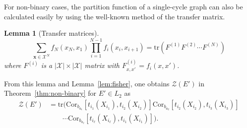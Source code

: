 \documentclass[a4paper,10pt,twoside,twocolumn,openany,final]{memoir}
\newcommand{\Cor}{\mathrm{Cor}}
\theoremstyle{plain}
\newtheorem{lemma}[theorem]{Lemma}
\theoremstyle{definition}
\theoremstyle{remark}
\begin{document}
For non-binary cases, the partition function of a single-cycle graph can also be calculated easily
by using the well-known method of the transfer matrix.
\begin{lemma}[Transfer matrices]
\begin{equation*}
\sum_{\bm{x}\in\mathcal{X}^N}
f_N(x_N, x_1) \prod_{i=1}^{N-1} f_i(x_i, x_{i+1})
= \mathrm{tr}(F^{(1)} F^{(2)} \dotsm F^{(N)})
\end{equation*}
where $F^{(i)}$ is a $|\mathcal{X}|\times |\mathcal{X}|$ matrix with $F^{(i)}_{x, x'} = f_i(x, x')$.
\end{lemma}
From this lemma and Lemma~\ref{lem:fisher},
one obtains $\mathcal{Z}(E')$
in Theorem~\ref{thm:non-binary}
for $E'\in L_2$ as
\begin{align}
\mathcal{Z}(E')&=
\mathrm{tr}
\big(
\Cor_{b_{a_1}}[t_{i_1}(X_{i_1}), t_{i_2}(X_{i_2})]
\Cor_{b_{a_2}}[t_{i_2}(X_{i_2}), t_{i_3}(X_{i_3})]\nonumber\\
&\qquad \dotsm
\Cor_{b_{a_{\ell}}}[t_{i_\ell}(X_{i_\ell}), t_{i_1}(X_{i_1})]
\big).
\label{eq:mloop}
\end{align}
\end{document}
